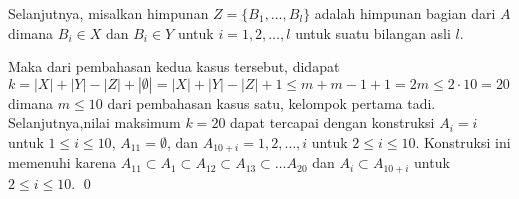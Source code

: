 \documentclass[11pt]{scrartcl}
\begin{document}
\begin{soalbaru}
\begin{solusi}
		Selanjutnya, misalkan himpunan $Z =\{B_1,\dots,B_l\}$ adalah himpunan bagian dari $A$ dimana $B_i \in X$ dan $B_i \in Y$ untuk $i=1,2,\dots,l$ untuk suatu bilangan asli $l$.
		
		Maka dari pembahasan kedua kasus tersebut, didapat $k=|X|+|Y|-|Z|+|{\emptyset}| = |X|+|Y|-|Z|+1 \le m + m -1+1 = 2m \le 2 \cdot 10 = 20$ dimana $m\le10$ dari pembahasan kasus satu, kelompok pertama tadi. Selanjutnya,nilai maksimum $k=20$ dapat tercapai dengan konstruksi $A_i = i$ untuk $1 \le i \le 10$, $A_{11}=\emptyset$, dan $A_{10+i} = {1,2,\dots,i}$ untuk $2 \le i \le 10$. Konstruksi ini memenuhi karena $A_{11}\subset A_1 \subset A_{12} \subset A_{13} \subset \dots A_{20}$ dan $A_i \subset A_{10+i}$ untuk $2 \le i \le 10$. \qed 
		\end{solusi}
	\end{soalbaru}
	\vspace{10pt}
	
\end{document}
